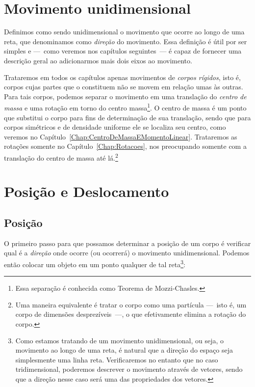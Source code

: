 \section{Movimento unidimensional}

Definimos como sendo unidimensional o movimento que ocorre ao longo de uma reta, que denominamos como \emph{direção} do movimento. Essa definição é útil por ser simples e ---~como veremos nos capítulos seguintes~--- é capaz de fornecer uma descrição geral ao adicionarmos mais dois eixos ao movimento.

Trataremos em todos os capítulos apenas movimentos de \emph{corpos rígidos}, isto é, corpos cujas partes que o constituem não se movem em relação umas às outras. Para tais corpos, podemos separar o movimento em uma translação do \emph{centro de massa} e uma rotação em torno do centro massa\footnote[][-2cm]{Essa separação é conhecida como Teorema de Mozzi-Chasles.}. O centro de massa é um ponto que substitui o corpo para fins de determinação de sua translação, sendo que para corpos simétricos e de densidade uniforme ele se localiza seu centro, como veremos no Capítulo~\ref{Chap:CentroDeMassaEMomentoLinear}. Trataremos as rotações somente no Capítulo~\ref{Chap:Rotacoes}, nos preocupando somente com a translação do centro de massa até lá.\footnote[][-3cm]{Uma maneira equivalente é tratar o corpo como uma partícula ---~isto é, um corpo de dimensões desprezíveis~---, o que efetivamente elimina a rotação do corpo.}

\section{Posição e Deslocamento}

\subsection{Posição}

O primeiro passo para que possamos determinar a posição de um corpo  é verificar qual é a \emph{direção} onde ocorre (ou ocorrerá) o movimento unidimensional. Podemos então colocar um objeto em um ponto qualquer de tal reta\footnote[][-3cm]{Como estamos tratando de um movimento unidimensional, ou seja, o movimento ao longo de uma reta, é natural que a direção do espaço seja simplesmente uma linha reta. Verificaremos no entanto que no caso tridimensional, poderemos descrever o movimento através de vetores, sendo que a direção nesse caso será uma das propriedades dos vetores.}:

